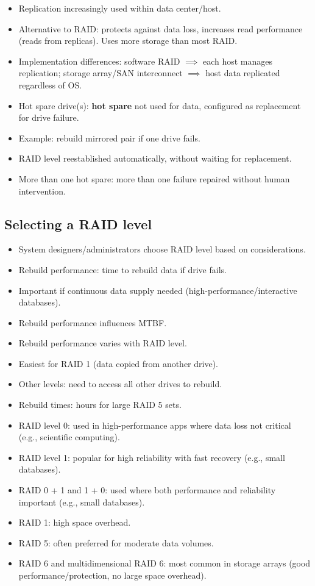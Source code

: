 \begin{itemize}
    \item Replication increasingly used within data center/host.
    \item Alternative to RAID: protects against data loss, increases read performance (reads from replicas). Uses more storage than most RAID.
    \item Implementation differences: software RAID $\implies$ each host manages replication; storage array/SAN interconnect $\implies$ host data replicated regardless of OS.
    \item Hot spare drive(s): \textbf{hot spare} not used for data, configured as replacement for drive failure.
    \item Example: rebuild mirrored pair if one drive fails.
    \item RAID level reestablished automatically, without waiting for replacement.
    \item More than one hot spare: more than one failure repaired without human intervention.
\end{itemize}

\subsection{Selecting a RAID level}
\begin{itemize}
    \item System designers/administrators choose RAID level based on considerations.
    \item Rebuild performance: time to rebuild data if drive fails.
    \item Important if continuous data supply needed (high-performance/interactive databases).
    \item Rebuild performance influences MTBF.
    \item Rebuild performance varies with RAID level.
    \item Easiest for RAID 1 (data copied from another drive).
    \item Other levels: need to access all other drives to rebuild.
    \item Rebuild times: hours for large RAID 5 sets.
    \item RAID level 0: used in high-performance apps where data loss not critical (e.g., scientific computing).
    \item RAID level 1: popular for high reliability with fast recovery (e.g., small databases).
    \item RAID 0 + 1 and 1 + 0: used where both performance and reliability important (e.g., small databases).
    \item RAID 1: high space overhead.
    \item RAID 5: often preferred for moderate data volumes.
    \item RAID 6 and multidimensional RAID 6: most common in storage arrays (good performance/protection, no large space overhead).
\end{itemize}

